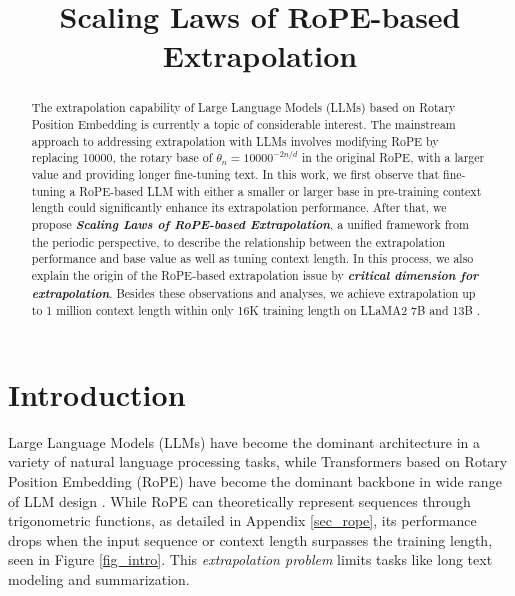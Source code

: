 \title{Scaling Laws of RoPE-based Extrapolation}

\begin{abstract}
The extrapolation capability of Large Language Models (LLMs) based on Rotary Position Embedding \citep{su2021roformer} is currently a topic of considerable interest. The mainstream approach to addressing extrapolation with LLMs involves modifying RoPE by replacing 10000, the rotary base of $\theta_n={10000}^{-2n/d}$ in the original RoPE, with a larger value and providing longer fine-tuning text. In this work, we first observe that fine-tuning a RoPE-based LLM with either a smaller or larger base in pre-training context length could significantly enhance its extrapolation performance. After that, we propose \textbf{\textit{Scaling Laws of RoPE-based Extrapolation}}, a unified framework from the periodic perspective, to describe the relationship between the extrapolation performance and base value as well as tuning context length. In this process, we also explain the origin of the RoPE-based extrapolation issue by \textbf{\textit{critical dimension for extrapolation}}. Besides these observations and analyses, we achieve extrapolation up to 1 million context length within only 16K training length on LLaMA2 7B and 13B \citep{touvron2023llama2}.
\end{abstract}

\section{Introduction}

Large Language Models (LLMs) have become the dominant architecture in a variety of natural language processing tasks\citep{gpt4,touvron2023llama,touvron2023llama2}, while Transformers \citep{vaswani2017attention} based on Rotary Position Embedding (RoPE) \citep{su2021roformer} have become the dominant backbone in wide range of LLM design \citep{chowdhery2022palm,nijkamp2022codegen,touvron2023llama,touvron2023llama2}. While RoPE can theoretically represent sequences through trigonometric functions, as detailed in Appendix \ref{sec_rope}, its performance drops when the input sequence or context length surpasses the training length\citep{press2021train,chen2023extending}, seen in Figure \ref{fig_intro}. This \textit{extrapolation problem} \citep{press2021train} limits tasks like long text modeling and summarization\citep{an2023eval}.


